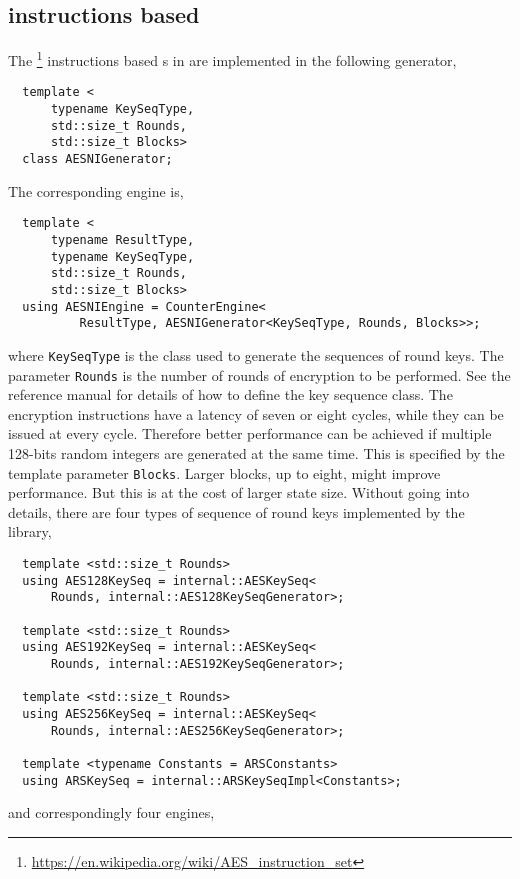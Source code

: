 \subsection{\protect\aesni instructions based \protect\rng}
\label{sub:AES-NI instructions based RNG}

The \aesni\footnote{\url{https://en.wikipedia.org/wiki/AES_instruction_set}}
instructions based \rng{}s in \textcite{Salmon:2011um} are implemented in the
following generator,
\begin{Verbatim}
  template <
      typename KeySeqType,
      std::size_t Rounds,
      std::size_t Blocks>
  class AESNIGenerator;
\end{Verbatim}
The corresponding \rng engine is,
\begin{Verbatim}
  template <
      typename ResultType,
      typename KeySeqType,
      std::size_t Rounds,
      std::size_t Blocks>
  using AESNIEngine = CounterEngine<
          ResultType, AESNIGenerator<KeySeqType, Rounds, Blocks>>;
\end{Verbatim}
where \verb|KeySeqType| is the class used to generate the sequences of round
keys. The parameter \verb|Rounds| is the number of rounds of \aes encryption to
be performed. See the reference manual for details of how to define the key
sequence class. The \aesni encryption instructions have a latency of seven or
eight cycles, while they can be issued at every cycle. Therefore better
performance can be achieved if multiple 128-bits random integers are generated
at the same time. This is specified by the template parameter \verb|Blocks|.
Larger blocks, up to eight, might improve performance. But this is at the cost
of larger state size. Without going into details, there are four types of
sequence of round keys implemented by the library,
\begin{Verbatim}
  template <std::size_t Rounds>
  using AES128KeySeq = internal::AESKeySeq<
      Rounds, internal::AES128KeySeqGenerator>;

  template <std::size_t Rounds>
  using AES192KeySeq = internal::AESKeySeq<
      Rounds, internal::AES192KeySeqGenerator>;

  template <std::size_t Rounds>
  using AES256KeySeq = internal::AESKeySeq<
      Rounds, internal::AES256KeySeqGenerator>;

  template <typename Constants = ARSConstants>
  using ARSKeySeq = internal::ARSKeySeqImpl<Constants>;
\end{Verbatim}
and correspondingly four \rng engines,

